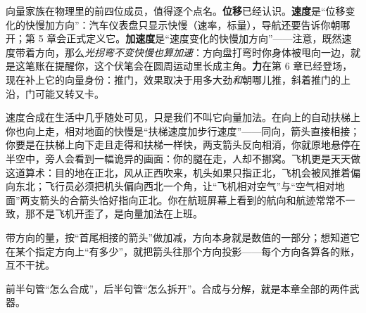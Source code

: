 向量家族在物理里的前四位成员，值得逐个点名。\textbf{位移}已经认识。\textbf{速度}是“位移变化的快慢加方向”：汽车仪表盘只显示快慢（速率，标量），导航还要告诉你朝哪开；第 5 章会正式定义它。\textbf{加速度}是“速度变化的快慢加方向”——注意，既然速度带着方向，那么\emph{光拐弯不变快慢也算加速}：方向盘打弯时你身体被甩向一边，就是这笔账在提醒你，这个伏笔会在圆周运动里长成主角。\textbf{力}在第 6 章已经登场，现在补上它的向量身份：推门，效果取决于用多大劲\emph{和}朝哪儿推，斜着推门的上沿，门可能又转又卡。

速度合成在生活中几乎随处可见，只是我们不叫它向量加法。在向上的自动扶梯上你也向上走，相对地面的快慢是“扶梯速度加步行速度”——同向，箭头直接相接；你要是在扶梯上向下走且走得和扶梯一样快，两支箭头反向相消，你就原地悬停在半空中，旁人会看到一幅诡异的画面：你的腿在走，人却不挪窝。飞机更是天天做这道算术：目的地在正北，风从正西吹来，机头如果只指正北，飞机会被风推着偏向东北；飞行员必须把机头偏向西北一个角，让“飞机相对空气”与“空气相对地面”两支箭头的合箭头恰好指向正北。你在航班屏幕上看到的航向和航迹常常不一致，那不是飞机开歪了，是向量加法在上班。


\begin{oneline}
带方向的量，按“首尾相接的箭头”做加减，方向本身就是数值的一部分；想知道它在某个指定方向上“有多少”，就把箭头往那个方向投影——每个方向各算各的账，互不干扰。
\end{oneline}

前半句管“怎么合成”，后半句管“怎么拆开”。合成与分解，就是本章全部的两件武器。


